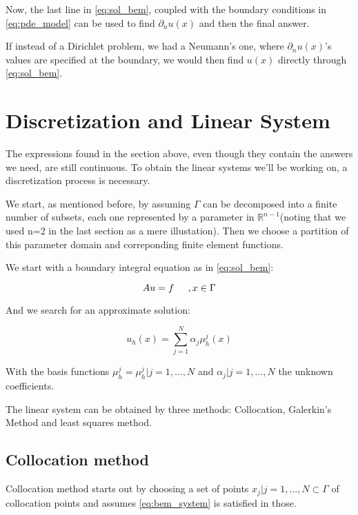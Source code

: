 Now, the last line in \ref{eq:sol_bem}, coupled with the boundary conditions in \ref{eq:pde_model} can be used to find $\partial_{n}u(x)$ and then the final answer.

If instead of a Dirichlet problem, we had a Neumann's one, where $\partial_{n}u(x)$'s values are specified at the boundary, we would then find $u(x)$ directly through \ref{eq:sol_bem}.

\section{Discretization and Linear System}

The expressions found in the section above, even though they contain the answers we need, are still continuous. To obtain the linear systems we'll be working on, a discretization process is necessary.

We start, as mentioned before, by assuming $\Gamma$ can be decomposed into a finite number of subsets, each one represented by a parameter in $\mathbb{R}^{n-1}$(noting that we used n=2 in the last section as a mere illustation). Then we choose a partition of this parameter domain and correponding finite element functions.

We start with a boundary integral equation as in \ref{eq:sol_bem}:

\begin{equation}\label{eq:bem_system}
    Au = f \hspace{0.2in}, x \in \Gamma
\end{equation}

And we search for an approximate solution:

\begin{equation}\label{eq:approx_sol}
    u_{h}(x) = \sum_{j=1}^{N}\alpha_{j} \mu_{h}^{j}(x)
\end{equation}

With the basis functions $\mu_{h}^{j}={\mu_{h}^{j}|j=1, \dots, N}$ and ${\alpha_{j}|j=1, \dots, N}$ the unknown coefficients.

The linear system can be obtained by three methods: Collocation, Galerkin's Method and least squares method.

\subsection{Collocation method}

Collocation method starts out by choosing a set of points ${x_{j}|j=1, \dots, N} \subset \Gamma$ of collocation points and assumes \ref{eq:bem_system} is satisfied in those.

